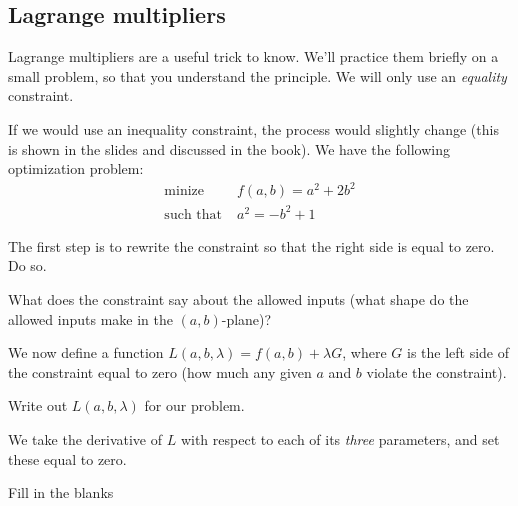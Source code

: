 \documentclass[11pt]{article}
\begin{document}
\subsection{Lagrange multipliers} 

Lagrange multipliers are a useful trick to know. We'll practice them briefly on a small problem, so that you understand the principle. We will only use an \emph{equality} constraint. 

If we would use an inequality constraint, the process would slightly change (this is shown in the slides and discussed in the book). We have the following optimization problem:
\begin{align*}
\text{minize} &\;f(a, b) = a^2 + 2b^2 \\
\text{such that} &\;a^2 = - b^2 + 1
\end{align*}

\qu The first step is to rewrite the constraint so that the right side is equal to zero. Do so.



\qu What does the constraint say about the allowed inputs (what shape do the allowed inputs make in the $(a, b)$-plane)?



We now define a function $L(a, b, \lambda) = f(a, b) + \lambda G$, where $G$ is the left side of the constraint equal to zero (how much any given $a$ and $b$ violate the constraint).\footnotemark 

\qu Write out $L(a, b, \lambda)$ for our problem.



We take the derivative of $L$ with respect to each of its \emph{three} parameters, and set these equal to zero. 

\qu Fill in the blanks
\end{document}

